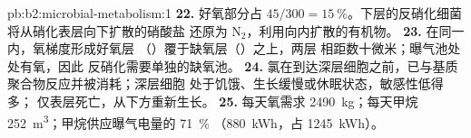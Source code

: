 \begin{solution}{pb:b2:microbial-metabolism:1}
\textbf{22.} 好氧部分占 $45/300 = \qty{15}{\%}$。下层的反硝化细菌
将从硝化表层向下扩散的硝酸盐
还原为 $\mathrm{N_2}$，利用向内扩散的有机物。
\textbf{23.} 在同一内，氧梯度形成好氧层
（）覆于缺氧层（）之上，两层
相距数十微米；曝气池处处有氧，因此
反硝化需要单独的缺氧池。
\textbf{24.} 氯在到达深层细胞之前，已与基质
聚合物反应并被消耗；深层细胞
处于饥饿、生长缓慢或休眠状态，敏感性低得多；
仅表层死亡，从下方重新生长。
\textbf{25.} 每天氧需求 \qty{2490}{kg}；每天甲烷
\qty{252}{m^3}；甲烷供应曝气电量的 \qty{71}{\%}
（\qty{880}{kWh}，占 \qty{1245}{kWh}）。
\end{solution}
